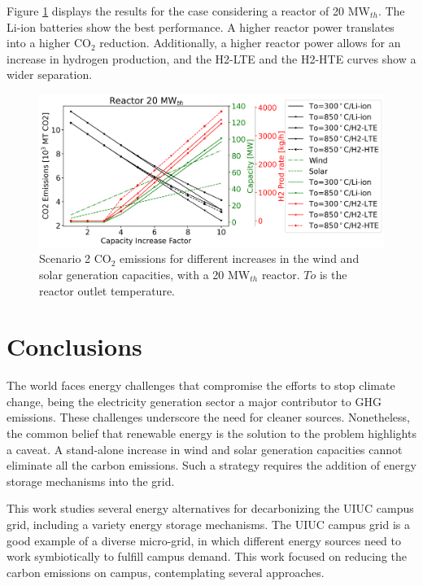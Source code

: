 \documentclass{anstrans}
\begin{document}
Figure \ref{fig:2-summer-20-emissions} displays the results for the case considering a reactor of 20 MW$_{th}$.
The Li-ion batteries show the best performance.
A higher reactor power translates into a higher CO$_2$ reduction.
Additionally, a higher reactor power allows for an increase in hydrogen production, and the H2-LTE and the H2-HTE curves show a wider separation.

\begin{figure}[htbp!] %
    \centering
    \includegraphics[width=0.99\linewidth]{figures/scenario2-20-summer-emissions}
    \hfill
    \caption{Scenario 2 CO$_2$ emissions for different increases in the wind and solar generation capacities, with a 20 MW$_{th}$ reactor. $To$ is the reactor outlet temperature.}
    \label{fig:2-summer-20-emissions}
\end{figure}


\section{Conclusions}

The world faces energy challenges that compromise the efforts to stop climate change, being the electricity generation sector a major contributor to GHG emissions.
These challenges underscore the need for cleaner sources.
Nonetheless, the common belief that renewable energy is the solution to the problem highlights a caveat.
A stand-alone increase in wind and solar generation capacities cannot eliminate all the carbon emissions.
Such a strategy requires the addition of energy storage mechanisms into the grid.

This work studies several energy alternatives for decarbonizing the UIUC campus grid, including a variety energy storage mechanisms.
The UIUC campus grid is a good example of a diverse micro-grid, in which different energy sources need to work symbiotically to fulfill campus demand.
This work focused on reducing the carbon emissions on campus, contemplating several approaches.
\end{document}
